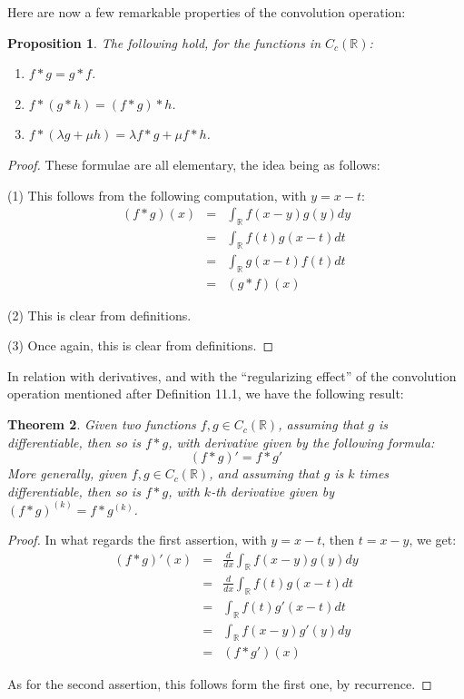 \documentclass[12pt]{amsbook}
\newtheorem{theorem}{Theorem}[chapter]
\newtheorem{proposition}[theorem]{Proposition}
\begin{document}
Here are now a few remarkable properties of the convolution operation:

\begin{proposition}
The following hold, for the functions in $C_c(\mathbb R)$:
\begin{enumerate}
\item $f*g=g*f$.

\item $f*(g*h)=(f*g)*h$.

\item $f*(\lambda g+\mu h)=\lambda f*g+\mu f*h$.
\end{enumerate}
\end{proposition}

\begin{proof}
These formulae are all elementary, the idea being as follows:

\medskip

(1) This follows from the following computation, with $y=x-t$:
\begin{eqnarray*}
(f*g)(x)
&=&\int_\mathbb R f(x-y)g(y)dy\\
&=&\int_\mathbb R f(t)g(x-t)dt\\
&=&\int_\mathbb R g(x-t)f(t)dt\\
&=&(g*f)(x)
\end{eqnarray*}

(2) This is clear from definitions.

\medskip

(3) Once again, this is clear from definitions.
\end{proof}

In relation with derivatives, and with the ``regularizing effect'' of the convolution operation mentioned after Definition 11.1, we have the following result:


\begin{theorem}
Given two functions $f,g\in C_c(\mathbb R)$, assuming that $g$ is differentiable, then so is $f*g$, with derivative given by the following formula:
$$(f*g)'=f*g'$$
More generally, given $f,g\in C_c(\mathbb R)$, and assuming that $g$ is $k$ times differentiable, then so is $f*g$, with $k$-th derivative given by $(f*g)^{(k)}=f*g^{(k)}$.
\end{theorem}

\begin{proof}
In what regards the first assertion, with $y=x-t$, then $t=x-y$, we get:
\begin{eqnarray*}
(f*g)'(x)
&=&\frac{d}{dx}\int_\mathbb R f(x-y)g(y)dy\\
&=&\frac{d}{dx}\int_\mathbb R f(t)g(x-t)dt\\
&=&\int_\mathbb R f(t)g'(x-t)dt\\
&=&\int_\mathbb R f(x-y)g'(y)dy\\
&=&(f*g')(x)
\end{eqnarray*}

As for the second assertion, this follows form the first one, by recurrence.
\end{proof}
\end{document}
